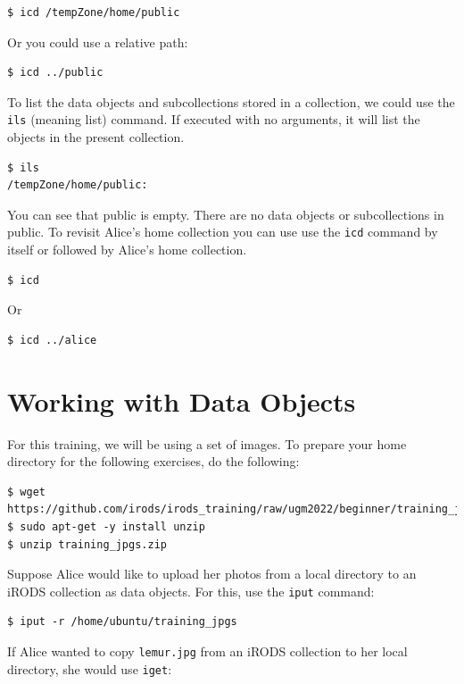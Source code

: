 \documentclass[10pt,oneside]{memoir}
\begin{document}
\begin{lstlisting}
$ icd /tempZone/home/public
\end{lstlisting}

Or you could use a relative path:

\begin{lstlisting}
$ icd ../public
\end{lstlisting}

To list the data objects and subcollections stored in a collection, we could use the \texttt{ils} (meaning list) command. If executed with no arguments, it will list the objects in the present collection.

\begin{lstlisting}
$ ils
/tempZone/home/public:
\end{lstlisting}

You can see that public is empty. There are no data objects or subcollections in public.
To revisit Alice's home collection you can use use the \texttt{icd} command by itself or followed by Alice's home collection.

\begin{lstlisting}
$ icd
\end{lstlisting}

Or

\begin{lstlisting}
$ icd ../alice
\end{lstlisting}

\section{Working with Data Objects}

For this training, we will be using a set of images. To prepare your home directory for the following exercises, do the following:

\begin{lstlisting}
$ wget https://github.com/irods/irods_training/raw/ugm2022/beginner/training_jpgs.zip
$ sudo apt-get -y install unzip
$ unzip training_jpgs.zip
\end{lstlisting}

Suppose Alice would like to upload her photos from a local directory to an iRODS collection as data objects. For this, use the \texttt{iput} command:

\begin{lstlisting}
$ iput -r /home/ubuntu/training_jpgs
\end{lstlisting}

If Alice wanted to copy \texttt{lemur.jpg} from an iRODS collection to her local directory, she would use \texttt{iget}:
\end{document}
